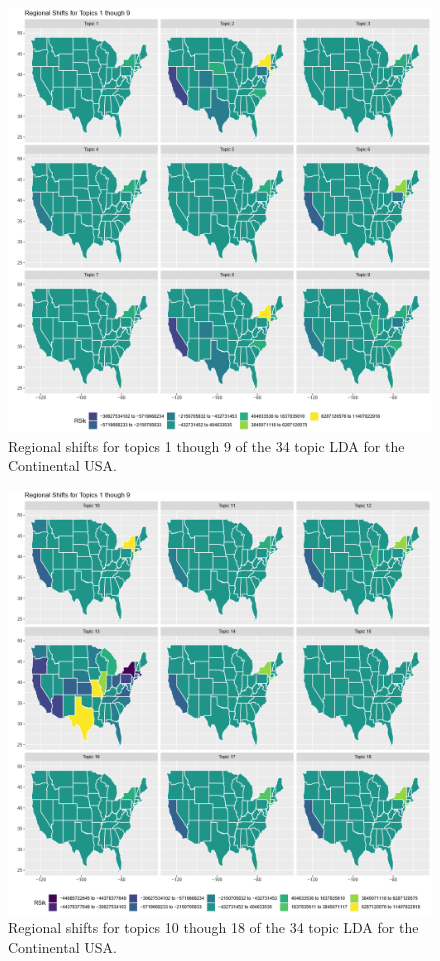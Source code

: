\nocite{NVCA2020data}



\begin{figure}
	\centering
	\includegraphics[width=\linewidth]{Figures/ChapterV/States_01_09}
	\caption[Regional Shifts using 34 Topic LDA, Topics 1 thought 9]{Regional shifts for topics 1 though 9 of the 34 topic LDA for the Continental USA.}
	\label{fig:shift-share_lda34-1-9}
\end{figure}

\begin{figure}
	\centering
	\includegraphics[width=\linewidth]{Figures/ChapterV/States_10_18}
	\caption[Regional Shifts using 34 Topic LDA, Topics 10 thought 19]{Regional shifts for topics 10 though 18 of the 34 topic LDA for the Continental USA.}
	\label{fig:shift-share_lda34-10-18}
\end{figure}

